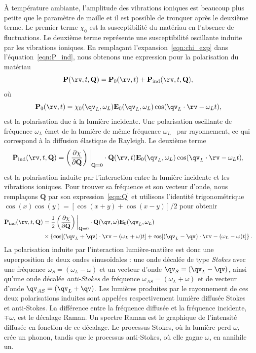À température ambiante, l'amplitude des vibrations ioniques est beaucoup plus petite que le paramètre de maille et il est possible de tronquer après le deuxième terme. Le premier terme $\chi_0$ est la susceptibilité du matériau en l'absence de fluctuations. Le deuxième terme représente une susceptibilité oscillante induite par les vibrations ioniques. En remplaçant l'expansion~\eqref{eqn:chi_exp} dans l'équation~\eqref{eqn:P_ind}, nous obtenons une expression pour la polarisation du matériau
\begin{equation}
    \mathbf{P}(\rv,t,\mathbf{Q}) = \mathbf{P}_0(\rv,t)+\mathbf{P}_\text{ind}(\rv,t,\mathbf{Q}),
\end{equation}
où
\begin{equation}
    \mathbf{P}_0(\rv,t) = \chi_0(\qv_L,\omega_L)\mathbf{E}_0(\qv_L,\omega_L)\cos(\qv_L\cdot\rv -\omega_L t),
\end{equation}
est la polarisation due à la lumière incidente. Une polarisation oscillante de fréquence $\omega_L$ émet de la lumière de même fréquence $\omega_L$~\cite{JacksonJD1999} par rayonnement, ce qui correspond à la diffusion élastique de Rayleigh. Le deuxième terme
\begin{equation}
    \mathbf{P}_\text{ind}(\rv,t,\mathbf{Q})=\left(\frac{\partial \chi}{\partial\mathbf{Q}}\right)\bigg\rvert_{\mathbf{Q}=0}\cdot\mathbf{Q}(\rv,t)\mathbf{E}_0(\qv_L,\omega_L)\cos(\qv_L\cdot\rv-\omega_L t),
\end{equation}
est la polarisation induite par l'interaction entre la lumière incidente et les vibrations ioniques. Pour trouver sa fréquence et son vecteur d'onde, nous remplaçons $\mathbf{Q}$ par son expression~\eqref{eqn:Q} et utilisons l'identité trigonométrique $\cos(x)\cos(y)=[\cos(x+y)+\cos(x-y)]/2$ pour obtenir
\begin{equation}
    \begin{split}
    \mathbf{P}_\text{ind}(\rv,t,\mathbf{Q}) &= \frac{1}{2}\left(\frac{\partial \chi}{\partial\mathbf{Q}}\right)\bigg\rvert_{\mathbf{Q}=0}\cdot\mathbf{Q}(\qv,\omega)\mathbf{E}_0(\qv_L,\omega_L)\\
    &\times\left\{\cos[(\qv_L+\qv)\cdot\rv-(\omega_L+\omega)t]+\cos[(\qv_L-\qv)\cdot\rv-(\omega_L-\omega)t]\right\}.
    \end{split}\label{eqn:P_Raman}
\end{equation}
La polarisation induite par l'interaction lumière-matière est donc une superposition de deux ondes sinusoïdales : une onde décalée de type \textit{Stokes} avec une fréquence $\omega_S=(\omega_L-\omega)$ et un vecteur d'onde $\qv_S=(\qv_L-\qv)$, ainsi qu'une onde décalée \textit{anti-Stokes} de fréquence $\omega_{AS}=(\omega_L+\omega)$ et de vecteur d'onde $\qv_{AS}=(\qv_L+\qv)$. Les lumières produites par le rayonnement de ces deux polarisations induites sont appelées respectivement lumière diffusée Stokes et anti-Stokes. La différence entre la fréquence diffusée et la fréquence incidente, $\mp\omega$, est le décalage Raman. Un spectre Raman est le graphique de l'intensité diffusée en fonction de ce décalage. Le processus Stokes, où la lumière perd $\omega$, crée un phonon, tandis que le processus anti-Stokes, où elle gagne $\omega$, en annihile un.

